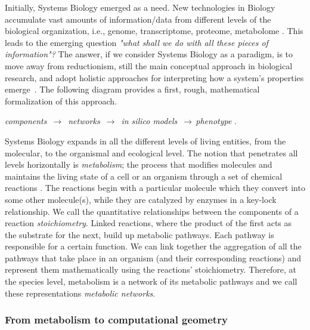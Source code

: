    Initially, Systems Biology emerged as a need. New technologies in Biology
   accumulate vast amounts of information/data from different levels of the
   biological organization, i.e., genome, transcriptome, proteome, metabolome
   \citep{quinn2016sample}. This leads to the emerging question \textit{"what shall
   we do with all these pieces of information"?} The answer, if we consider
   Systems Biology as a paradigm, is to move away from reductionism, still the main
   conceptual approach in biological research, and adopt holistic approaches for
   interpreting how a system's properties emerge~\citep{noble2008music}. The
   following diagram provides a first, rough, mathematical formalization of this
   approach.

   \begin{center}
   \textit{components} $\,\to\,$ \textit{networks} $\,\to\,$ \textit{in silico models} $\,\to\,$\textit{phenotype} \citep{palsson2015systems}. \\ \end{center}

   Systems Biology expands in all the different levels of living entities, from the
   molecular, to the organismal and ecological level. The notion that
   penetrates all levels horizontally is \emph{metabolism}; the
   process that modifies molecules and  maintains the living state of a
   cell or an organism through a set of chemical reactions
   \citep{schramski2015metabolic}. The reactions begin with a particular molecule
   which they convert into some other molecule(s), while they are catalyzed by
   enzymes in a key-lock relationship.
   We call the quantitative relationships between the components of a reaction   \emph{stoichiometry}.
   Linked reactions, where the product of the first acts as the substrate for the
   next, build up metabolic pathways. Each pathway is responsible for a certain
   function. We can link together the aggregation of all the pathways that take
   place in an organism (and their corresponding reactions)
   and represent them mathematically using  the reactions' stoichiometry.
   Therefore, at the species level, metabolism is a network of its metabolic pathways and we call
   these representations \emph{metabolic networks}.


   \subsubsection*{From metabolism to computational geometry}

